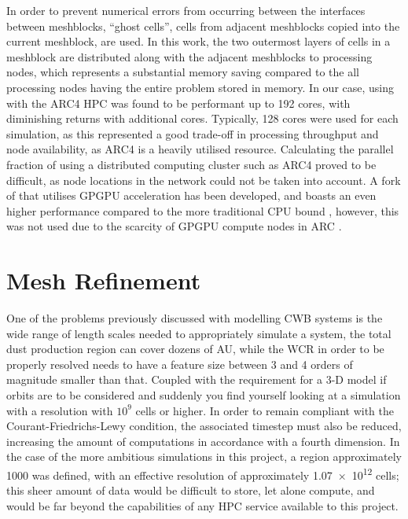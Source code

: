 In order to prevent numerical errors from occurring between the interfaces between meshblocks, ``ghost cells'', cells from adjacent meshblocks copied into the current meshblock, are used.
In this work, the two outermost layers of cells in a meshblock are distributed along with the adjacent meshblocks to processing nodes, which represents a substantial memory saving compared to the all processing nodes having the entire problem stored in memory.
In our case, using \athena{} with the ARC4 HPC was found to be performant up to \num{192} cores, with diminishing returns with additional cores.
Typically, \num{128} cores were used for each simulation, as this represented a good trade-off in processing throughput and node availability, as ARC4 is a heavily utilised resource.
Calculating the parallel fraction of \athena{} using a distributed computing cluster such as ARC4 proved to be difficult, as node locations in the network could not be taken into account.
A fork of \athena{} that utilises GPGPU acceleration has been developed, and boasts an even higher performance compared to the more traditional CPU bound \athena{}, however, this was not used due to the scarcity of GPGPU compute nodes in ARC \parencite{greteKAthenaPerformancePortable2020}.


\section{Mesh Refinement}
\label{sec:refinement}

One of the problems previously discussed with modelling CWB systems is the wide range of length scales needed to appropriately simulate a system, the total dust production region can cover dozens of AU, while the WCR in order to be properly resolved needs to have a feature size between 3 and 4 orders of magnitude smaller than that.
Coupled with the requirement for a 3-D model if orbits are to be considered and suddenly you find yourself looking at a simulation with a resolution with $10^9$ cells or higher.
In order to remain compliant with the Courant-Friedrichs-Lewy condition, the associated timestep must also be reduced, increasing the amount of computations in accordance with a fourth dimension. %
In the case of the more ambitious simulations in this project, a region approximately \SI{1000}{\au} was defined, with an effective resolution of approximately \num{1.07e12} cells; this sheer amount of data would be difficult to store, let alone compute, and would be far beyond the capabilities of any HPC service available to this project.

